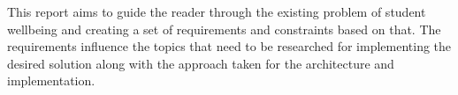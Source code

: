 This report aims to guide the reader through the existing problem of student wellbeing and creating a set of requirements and constraints based on that.
The requirements influence the topics that need to be researched for implementing the desired solution along with the approach taken for the 
architecture and implementation.





